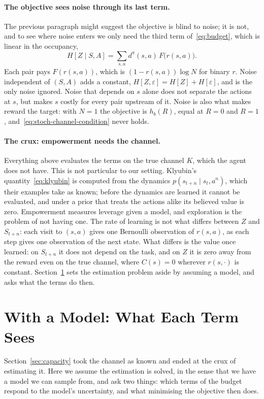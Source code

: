 \documentclass[11pt]{article}
\theoremstyle{remark}
\newcommand{\1}{\mathds{1}}
\newcommand{\occ}{d^{\pi}}
\newcommand{\Hf}[1]{H\!\left[#1\right]}
\begin{document}
\paragraph{The objective sees noise through its last term.}
The previous paragraph might suggest the objective is blind to noise; it is not, and to see where noise enters we only need the third term of~\eqref{eq:budget}, which is linear in the occupancy,
\begin{equation}
  \Hf{Z\mid S,A}=\sum_{s,a}\occ(s,a)\,F\big(r(s,a)\big).
\end{equation}
Each pair pays $F(r(s,a))$, which is $(1-r(s,a))\log N$ for binary $r$.
Noise independent of $(S,A)$ adds a constant, $\Hf{Z,\varepsilon}=\Hf{Z}+\Hf{\varepsilon}$, and is the only noise ignored.
Noise that depends on $s$ alone does not separate the actions at $s$, but makes $s$ costly for every pair upstream of it.
Noise is also what makes reward the target: with $N=1$ the objective is $h_b(R)$, equal at $R=0$ and $R=1$, and~\eqref{eq:stoch-channel-condition} never holds.

\paragraph{The crux: empowerment needs the channel.}
Everything above evaluates the terms on the true channel $K$, which the agent does not have.
This is not particular to our setting.
Klyubin's quantity~\eqref{eq:klyubin} is computed from the dynamics $p(s_{t+n}\mid s_t,a^n)$, which their examples take as known; before the dynamics are learned it cannot be evaluated, and under a prior that treats the actions alike its believed value is zero.
Empowerment measures leverage given a model, and exploration is the problem of not having one.
The rate of learning is not what differs between $Z$ and $S_{t+n}$: each visit to $(s,a)$ gives one Bernoulli observation of $r(s,a)$, as each step gives one observation of the next state.
What differs is the value once learned: on $S_{t+n}$ it does not depend on the task, and on $Z$ it is zero away from the reward even on the true channel, where $C(s)=0$ wherever $r(s,\cdot)$ is constant.
Section~\ref{sec:model} sets the estimation problem aside by assuming a model, and asks what the terms do then.

\section{With a Model: What Each Term Sees}
\label{sec:model}
Section~\ref{sec:capacity} took the channel as known and ended at the crux of estimating it.
Here we assume the estimation is solved, in the sense that we have a model we can sample from, and ask two things: which terms of the budget respond to the model's uncertainty, and what minimising the objective then does.
\end{document}
